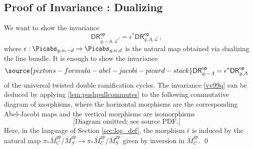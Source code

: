 
\subsection{Proof of Invariance \invnrI{}: {\rm Dualizing}}
We want to show the invariance
        $$\mathsf{DR}^{\mathsf{op}}_{g,-A, \mathcal{L}^*}
        =\epsilon^* \mathsf{DR}^{\mathsf{op}}_{g,A, \mathcal{L}}
        \, , $$
where $\epsilon: \Picabs_{g,n,-d} \rightarrow \Picabs_{g,n,d}$
is the natural map obtained via dualizing the line bundle.  It is enough to show the invariance
\begin{equation}\label{vv99q}
\source{pixtons-formula-abel-jacobi-picard-stack}
\mathsf{DR}^{\mathsf{op}}_{g,-A} = \epsilon^* \mathsf{DR}^{\mathsf{op}}_{g,A}
\end{equation}
of the universal twisted double ramification cycles.
The invariance \eqref{vv99q} can be deduced by applying \cref{lem:pushpullcommutes} to the following commutative diagram of morphisms, where the horizontal morphisms are the corresponding Abel-Jacobi maps and the vertical morphisms are isomorphisms
\[\text{[Diagram omitted; see source PDF.]}
\]
Here, in the language of Section \ref{sec:log_def}, the morphism $\widehat \epsilon$ is induced by the natural map $\pi_*\bar M_C^{gp}/\bar M_S^{gp} \to \pi_*\bar M_C^{gp}/\bar M_S^{gp}$ given by inversion in $\bar M_C^{gp}$. \qed

